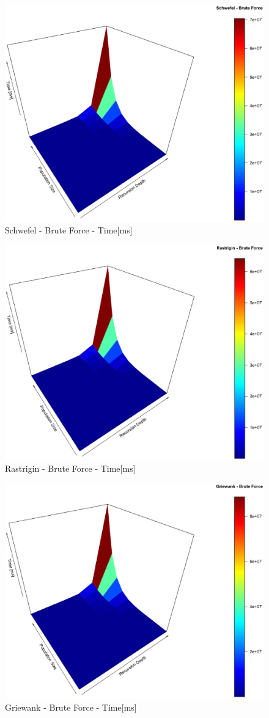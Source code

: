 \documentclass[conference]{IEEEtran}
\begin{document}
\begin{figure}[tbp]
\centering
\includegraphics[width=1.0\hsize,height=0.65\hsize]{fig23.eps}
\caption{Schwefel - Brute Force - Time[ms]}
\label{fig18}
\end{figure}

\begin{figure}[tbp]
\centering
\includegraphics[width=1.0\hsize,height=0.65\hsize]{fig26.eps}
\caption{Rastrigin - Brute Force - Time[ms]}
\label{fig19}
\end{figure}

\begin{figure}[tbp]
\centering
\includegraphics[width=1.0\hsize,height=0.65\hsize]{fig29.eps}
\caption{Griewank - Brute Force - Time[ms]}
\label{fig20}
\end{figure}
\end{document}
